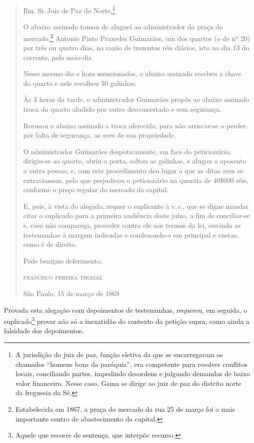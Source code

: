 \begin{quote}
Ilm. Sr.\,Juiz de Paz do Norte,\footnote{A jurisdição do juiz de paz,
  função eletiva da que se encarregavam os chamados ``homens bons da
  paróquia'', era competente para resolver conflitos locais, conciliando
  partes, impedindo desordens e julgando demandas de baixo valor
  financeiro. Nesse caso, Gama se dirige ao juiz de paz do distrito
  norte da freguesia da Sé.}

O abaixo assinado tomou de aluguel ao administrador da praça do
mercado,\footnote{Estabelecida em 1867, a praça do mercado da rua 25 de
  março foi o mais importante centro de abastecimento da capital.}
Antonio Pinto Praxedes Guimarães, um dos quartos (o de nº 20) por três
ou quatro dias, na razão de trezentos réis diários, isto no dia 13 do
corrente, pelo meio-dia

Nesse mesmo dia e hora mencionados, o abaixo assinado recebeu a chave do
quarto e nele recolheu 50 galinhas.

Às 3 horas da tarde, o administrador Guimarães propôs ao abaixo assinado
troca do quarto aludido por outro desconsertado e sem segurança.

Recusou o abaixo assinado a troca oferecida, para não arriscar-se a
perder, por falta de segurança, as aves de sua propriedade.

O administrador Guimarães despoticamente, em face do peticionário,
dirigiu-se ao quarto, abriu a porta, soltou as galinhas, e alugou o
aposento a outra pessoa; e, com este procedimento deu lugar a que as
ditas aves se extraviassem, pelo que prejudicou o peticionário na
quantia de 40\$000 réis, conforme o preço regular do mercado da capital.

E, pois, à vista do alegado, requer o suplicante à v.\,s., que se digne
mandar citar o suplicado para a primeira audiência deste juízo, a fim de
conciliar-se e, caso não compareça, proceder contra ele nos termos da
lei, ouvindo as testemunhas à margem indicadas e condenando-o em
principal e custas, como é de direito.

\begin{flushright}
Pede benigno deferimento,

\textsc{francisco pereira thomaz}

São Paulo, 15 de março de 1869
\end{flushright}
\end{quote}

Provada esta alegação com depoimentos de testemunhas, requereu, em
seguida, o suplicado\footnote{Aquele que recorre de sentença, que
  interpõe recurso.} provar não só a inexatidão do contexto da petição
supra, como ainda a falsidade dos depoimentos.

